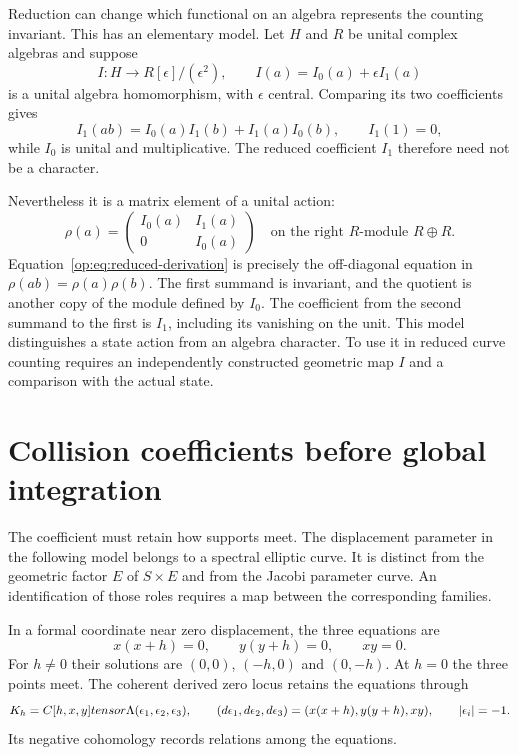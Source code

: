 Reduction can change which functional on an algebra represents
the counting invariant. This has an elementary model.
Let $H$ and $R$ be unital complex algebras and suppose
\[
 I:H\longrightarrow R[\epsilon]/(\epsilon^2),\qquad
 I(a)=I_0(a)+\epsilon I_1(a)
\]
is a unital algebra homomorphism, with $\epsilon$ central.
Comparing its two coefficients gives
\begin{equation}\label{op:eq:reduced-derivation}
 I_1(ab)=I_0(a)I_1(b)+I_1(a)I_0(b),\qquad I_1(1)=0,
\end{equation}
while $I_0$ is unital and multiplicative.
The reduced coefficient $I_1$ therefore need not be a character.

Nevertheless it is a matrix element of a unital action:
\begin{equation}\label{op:eq:reduced-module}
 \rho(a)=\begin{pmatrix}I_0(a)&I_1(a)\\0&I_0(a)\end{pmatrix}
       \quad\text{on the right $R$-module }R\oplus R.
\end{equation}
Equation~\eqref{op:eq:reduced-derivation} is precisely the
off-diagonal equation in $\rho(ab)=\rho(a)\rho(b)$.
The first summand is invariant, and the quotient is another copy
of the module defined by $I_0$.
The coefficient from the second summand to the first is $I_1$,
including its vanishing on the unit.
This model distinguishes a state action from an algebra character.
To use it in reduced curve counting requires an independently
constructed geometric map $I$ and a comparison with the actual state.

\section{Collision coefficients before global integration}
\label{op:sec:collision-coefficients}

The coefficient must retain how supports meet.
The displacement parameter in the following model belongs to a
spectral elliptic curve. It is distinct from the geometric factor
$E$ of $S\times E$ and from the Jacobi parameter curve.
An identification of those roles requires a map between the
corresponding families.

In a formal coordinate near zero displacement, the three equations are
\[
 x(x+h)=0,\qquad y(y+h)=0,\qquad xy=0.
\]
For $h\ne0$ their solutions are $(0,0)$, $(-h,0)$ and $(0,-h)$.
At $h=0$ the three points meet.
The coherent derived zero locus retains the equations through
\[
 K_h=C[h,x,y]tensor\Lambda(\epsilon_1,\epsilon_2,\epsilon_3),
 \qquad
 (d\epsilon_1,d\epsilon_2,d\epsilon_3)
       =(x(x+h),y(y+h),xy),\qquad |\epsilon_i|=-1.
\]
Its negative cohomology records relations among the equations.


